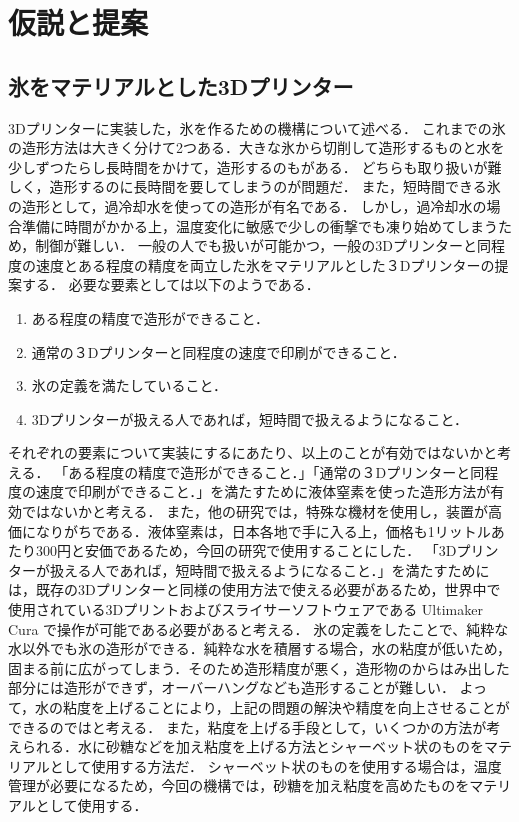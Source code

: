 \chapter{仮説と提案}
\label{chp:first}

\section{氷をマテリアルとした3Dプリンター}
\label{sec:paragraph}

3Dプリンターに実装した，氷を作るための機構について述べる．
これまでの氷の造形方法は大きく分けて2つある．大きな氷から切削して造形するものと水を少しずつたらし長時間をかけて，造形するのもがある．
どちらも取り扱いが難しく，造形するのに長時間を要してしまうのが問題だ．
また，短時間できる氷の造形として，過冷却水を使っての造形が有名である．
しかし，過冷却水の場合準備に時間がかかる上，温度変化に敏感で少しの衝撃でも凍り始めてしまうため，制御が難しい．
一般の人でも扱いが可能かつ，一般の3Dプリンターと同程度の速度とある程度の精度を両立した氷をマテリアルとした３Dプリンターの提案する．
必要な要素としては以下のようである．

\begin{enumerate}
  \item ある程度の精度で造形ができること． 
  \item 通常の３Dプリンターと同程度の速度で印刷ができること．
  \item 氷の定義を満たしていること．
  \item 3Dプリンターが扱える人であれば，短時間で扱えるようになること．
 \end{enumerate}

それぞれの要素について実装にするにあたり、以上のことが有効ではないかと考える．
「ある程度の精度で造形ができること．」「通常の３Dプリンターと同程度の速度で印刷ができること．」を満たすために液体窒素を使った造形方法が有効ではないかと考える．
また，他の研究では，特殊な機材を使用し，装置が高価になりがちである．液体窒素は，日本各地で手に入る上，価格も1リットルあたり300円と安価であるため，今回の研究で使用することにした．
「3Dプリンターが扱える人であれば，短時間で扱えるようになること．」を満たすためには，既存の3Dプリンターと同様の使用方法で使える必要があるため，世界中で使用されている3Dプリントおよびスライサーソフトウェアである Ultimaker Cura で操作が可能である必要があると考える．
氷の定義をしたことで、純粋な水以外でも氷の造形ができる．純粋な水を積層する場合，水の粘度が低いため，固まる前に広がってしまう．そのため造形精度が悪く，造形物のからはみ出した部分には造形ができず，オーバーハングなども造形することが難しい．
よって，水の粘度を上げることにより，上記の問題の解決や精度を向上させることができるのではと考える．
また，粘度を上げる手段として，いくつかの方法が考えられる．水に砂糖などを加え粘度を上げる方法とシャーベット状のものをマテリアルとして使用する方法だ．
シャーベット状のものを使用する場合は，温度管理が必要になるため，今回の機構では，砂糖を加え粘度を高めたものをマテリアルとして使用する．

